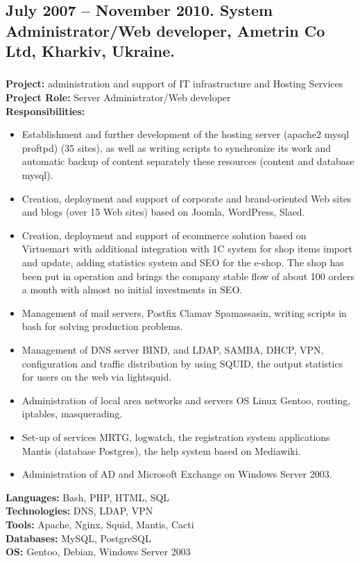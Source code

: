\documentclass[letterpaper]{article}
\begin{document}
\subsection{July 2007 – November 2010. System Administrator/Web developer, Ametrin Co Ltd, Kharkiv, Ukraine.}
\label{sec-2-2}
\subsubsection{}
\label{sec-2-2-1}
\textbf{Project:} administration and support of IT infrastructure and Hosting Services\\
\textbf{Project Role:}  Server Administrator/Web developer\\
\textbf{Responsibilities:}\\
\begin{itemize}
\item Establishment and further development of the hosting server (apache2 mysql proftpd) (35 sites), as well as writing scripts to synchronize its work and automatic backup of content separately these resources (content and database mysql).
\item Creation, deployment and support of corporate and brand-oriented Web sites and blogs (over 15 Web sites) based on Joomla, WordPress, Slaed.
\item Creation, deployment and support of ecommerce solution based on Virtuemart with additional integration with 1C system for shop items import and update, adding statistics system and SEO for the e-shop. The shop has been put in operation and brings the company stable flow of about 100 orders a month with almost no initial investments in SEO.
\item Management of mail servers, Postfix Clamav Spamassasin, writing scripts in bash for solving production problems.
\item Management of DNS server BIND, and LDAP, SAMBA, DHCP, VPN, configuration and traffic distribution by using SQUID, the output statistics for users on the web via lightsquid.
\item Administration of local area networks and servers OS Linux Gentoo, routing, iptables, masquerading.
\item Set-up of services MRTG, logwatch, the registration system applications Mantis (database Postgres), the help system based on Mediawiki.
\item Administration of AD and Microsoft Exchange on Windows Server 2003.
\end{itemize}
\textbf{Languages:} Bash, PHP,  HTML, SQL\\
\textbf{Technologies:} DNS, LDAP, VPN\\
\textbf{Tools:}  Apache, Nginx, Squid, Mantis, Cacti\\
\textbf{Databases:} MySQL, PostgreSQL\\
\textbf{OS:} Gentoo, Debian, Windows Server 2003\\
\end{document}
